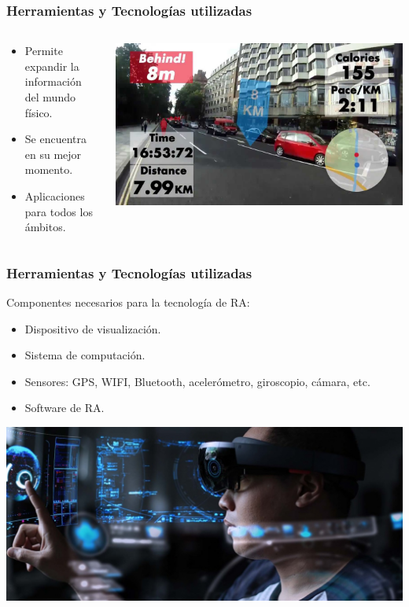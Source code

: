 \begin{frame}
	\frametitle{Herramientas y Tecnologías utilizadas}
	\begin{columns}
		\begin{column}{0.6\textwidth}
			\begin{itemize}
				\item Permite expandir la información del mundo físico.
				\item Se encuentra en su mejor momento.
				\item Aplicaciones para todos los ámbitos. 
			\end{itemize}
			\endblock{}
		\end{column}
		\begin{column}{0.4\textwidth}
			\vfill 
			\begin{center}
				\includegraphics[width=0.8\linewidth]{Images/googleglass}
			\end{center}
		\end{column}
	\end{columns}
\end{frame}

\begin{frame}
	\frametitle{Herramientas y Tecnologías utilizadas}
			Componentes necesarios para la tecnología de RA:
			\begin{itemize}
				\item {Dispositivo de visualización.}
				\item {Sistema de computación.}
				\item {Sensores: GPS, WIFI, Bluetooth, acelerómetro, giroscopio, cámara, etc.}
				\item {Software de RA.}
			\end{itemize}
		\endblock{}
		\vfill 
		\begin{center}
			\includegraphics[width=0.7\linewidth]{Images/hololens}
		\end{center}
\end{frame}		
		



